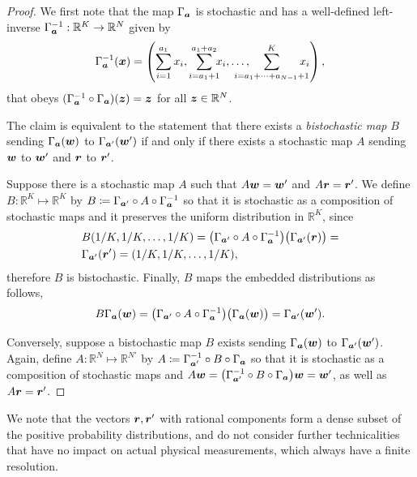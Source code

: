 \documentclass[pra,
aps,
twocolumn,
superscriptaddress,
groupedaddress,
nofootinbib,
reprint
]{revtex4-1}
\begin{document}
\begin{proof}
	We first note that the map $\Gamma_{\bm{a}}$ is stochastic and has a well-defined left-inverse $\Gamma^{-1}_{\bm{a}}: \mathbb{R}^K \rightarrow \mathbb{R}^N$ given by
\begin{equation}
	\Gamma^{-1}_{\bma}(\x) = \left( \sum_{i=1}^{a_1} x_i,  \sum_{i = a_1 +1}^{a_1 + a_2} \hspace{-5pt} x_i, \dots , \hspace{-15pt} \sum_{i=a_1 + \dots + a_{N-1}+1}^{K} \hspace{-10pt} x_i \right),
\end{equation}
that obeys $(\Gamma^{-1}_{\bm{a}} \circ \Gamma_{\bm{a}}) (\bm{z}) = \bm{z}$ for all $\bm{z} \in \mathbb{R}^N$. 

The claim is equivalent to the statement that there exists a \emph{bistochastic map} $B$ sending $\Gamma_{\bm{a}}(\boldsymbol{w})$ to $\Gamma_{\bm{a}'}(\boldsymbol{w}')$ if and only if there exists a stochastic map $A$ sending $\boldsymbol{w}$ to $\boldsymbol{w}'$ and $\boldsymbol{r}$ to $\boldsymbol{r}'$.

Suppose there is a stochastic map $A$ such that $A\boldsymbol{w}=\boldsymbol{w}'$ and $A\boldsymbol{r} = \boldsymbol{r}'$. 
We define $B:\mathbb{R}^K \mapsto \mathbb{R}^K$ by $B \coloneqq \Gamma_{\bm{a}'} \circ A \circ \Gamma_{\bm{a}}^{-1}$ so that it is stochastic as a composition of stochastic maps and it preserves the uniform distribution in $\mathbb{R}^K$, since
\begin{align}
	&B(1/K, 1/K, \dots, 1/K) = \big( \Gamma_{\bm{a}'} \circ A \circ \Gamma_{\bm{a}}^{-1} \big) \big( \Gamma_{\bm{a}'}(\boldsymbol{r}) \big) = \nonumber\\
	&\Gamma_{\bm{a}'} (\boldsymbol{r}') = (1/K, 1/K, \dots, 1/K),
\end{align}
therefore $B$ is bistochastic.
Finally, $B$ maps the embedded distributions as follows,
\begin{equation}
	B \Gamma_{\bm{a}}(\boldsymbol{w}) = \big( \Gamma_{\bm{a}'} \circ A \circ \Gamma_{\bm{a}}^{-1} \big) \big( \Gamma_{\bm{a}}(\boldsymbol{w}) \big) = \Gamma_{\bm{a}'} (\boldsymbol{w}').
\end{equation}

Conversely, suppose a bistochastic map $B$ exists sending $\Gamma_{\bm{a}}(\boldsymbol{w})$ to $\Gamma_{\bm{a}'}(\boldsymbol{w}')$. Again, define $A: \mathbb{R}^N \mapsto \mathbb{R}^{N'}$ by $A \coloneqq \Gamma_{\bm{a}'}^{-1} \circ B \circ \Gamma_{\bm{a}}$ so that it is stochastic as a composition of stochastic maps and $A \boldsymbol{w} = \big( \Gamma_{\bm{a}'}^{-1} \circ B \circ \Gamma_{\bm{a}} \big) \boldsymbol{w} = \boldsymbol{w}'$, as well as $A \boldsymbol{r} = \boldsymbol{r}'$.
\end{proof}
We note that the vectors $\boldsymbol{r}, \boldsymbol{r}'$ with rational components form a dense subset of the positive probability distributions, and do not consider further technicalities that have no impact on actual physical measurements, which always have a finite resolution.
\end{document}
